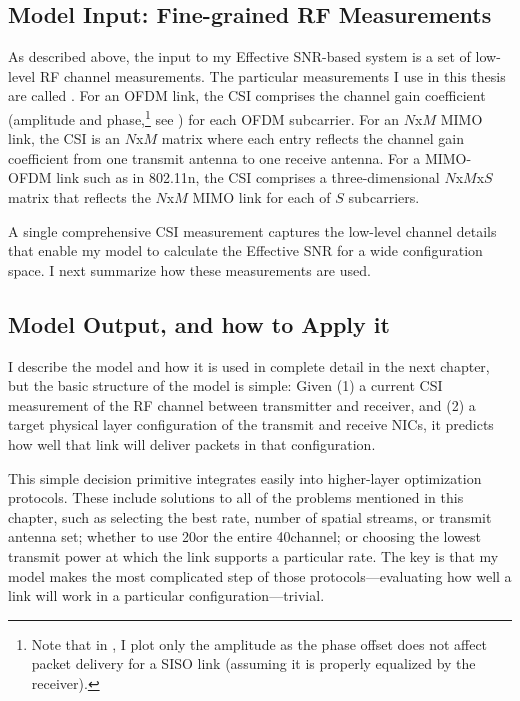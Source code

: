 \subsection{Model Input: Fine-grained RF Measurements}
\label{sec:csi}
As described above, the input to my Effective SNR-based system is a set of low-level RF channel measurements. The particular measurements I use in this thesis are called . For an OFDM link, the CSI comprises the channel gain coefficient (amplitude and phase,\footnote{Note that in , I plot only the amplitude as the phase offset does not affect packet delivery for a SISO link (assuming it is properly equalized by the receiver).} see ) for each OFDM subcarrier. For an $N$x$M$ MIMO link, the CSI is an $N$x$M$ matrix where each entry reflects the channel gain coefficient from one transmit antenna to one receive antenna. For a MIMO-OFDM link such as in 802.11n, the CSI comprises a three-dimensional $N$x$M$x$S$ matrix that reflects the $N$x$M$ MIMO link for each of $S$ subcarriers.

A single comprehensive CSI measurement captures the low-level channel details that enable my model to calculate the Effective SNR for a wide configuration space. I next summarize how these measurements are used.

\subsection{Model Output, and how to Apply it}
I describe the model and how it is used in complete detail in the next chapter, but the basic structure of the model is simple: Given (1) a current CSI measurement of the RF channel between transmitter and receiver, and (2) a target physical layer configuration of the transmit and receive NICs, it predicts how well that link will deliver packets in that configuration.

This simple decision primitive integrates easily into higher-layer optimization protocols. These include solutions to all of the problems mentioned in this chapter, such as selecting the best rate, number of spatial streams, or transmit antenna set; whether to use 20\MHz or the entire 40\MHz channel; or choosing the lowest transmit power at which the link supports a particular rate. The key is that my model makes the most complicated step of those protocols---evaluating how well a link will work in a particular configuration---trivial.


